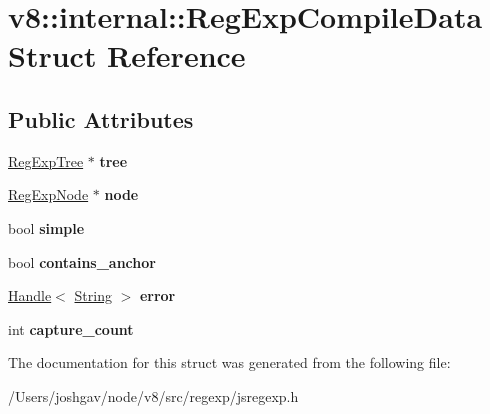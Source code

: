 \hypertarget{structv8_1_1internal_1_1_reg_exp_compile_data}{}\section{v8\+:\+:internal\+:\+:Reg\+Exp\+Compile\+Data Struct Reference}
\label{structv8_1_1internal_1_1_reg_exp_compile_data}
\subsection*{Public Attributes}
\begin{DoxyCompactItemize}
\item 
\hyperlink{classv8_1_1internal_1_1_reg_exp_tree}{Reg\+Exp\+Tree} $\ast$ {\bfseries tree}\hypertarget{structv8_1_1internal_1_1_reg_exp_compile_data_a3708590201a9779d3673351f2f00f5b5}{}\label{structv8_1_1internal_1_1_reg_exp_compile_data_a3708590201a9779d3673351f2f00f5b5}

\item 
\hyperlink{classv8_1_1internal_1_1_reg_exp_node}{Reg\+Exp\+Node} $\ast$ {\bfseries node}\hypertarget{structv8_1_1internal_1_1_reg_exp_compile_data_a5c7d6ebed31abb05a2e5c36b9845401a}{}\label{structv8_1_1internal_1_1_reg_exp_compile_data_a5c7d6ebed31abb05a2e5c36b9845401a}

\item 
bool {\bfseries simple}\hypertarget{structv8_1_1internal_1_1_reg_exp_compile_data_a5aa50533560892ee932515808bd70093}{}\label{structv8_1_1internal_1_1_reg_exp_compile_data_a5aa50533560892ee932515808bd70093}

\item 
bool {\bfseries contains\+\_\+anchor}\hypertarget{structv8_1_1internal_1_1_reg_exp_compile_data_a25f107ad7d0816bc0a970cae153d2bb6}{}\label{structv8_1_1internal_1_1_reg_exp_compile_data_a25f107ad7d0816bc0a970cae153d2bb6}

\item 
\hyperlink{classv8_1_1internal_1_1_handle}{Handle}$<$ \hyperlink{classv8_1_1internal_1_1_string}{String} $>$ {\bfseries error}\hypertarget{structv8_1_1internal_1_1_reg_exp_compile_data_a8a47f8e4d306fce7d1b8596414248760}{}\label{structv8_1_1internal_1_1_reg_exp_compile_data_a8a47f8e4d306fce7d1b8596414248760}

\item 
int {\bfseries capture\+\_\+count}\hypertarget{structv8_1_1internal_1_1_reg_exp_compile_data_a1e24fe15bae48fc5fa0bd565dadca421}{}\label{structv8_1_1internal_1_1_reg_exp_compile_data_a1e24fe15bae48fc5fa0bd565dadca421}

\end{DoxyCompactItemize}


The documentation for this struct was generated from the following file\+:\begin{DoxyCompactItemize}
\item 
/\+Users/joshgav/node/v8/src/regexp/jsregexp.\+h\end{DoxyCompactItemize}
